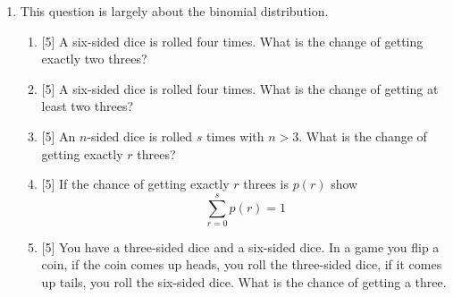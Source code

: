 \documentclass{article}
\newif\ifanswer
\begin{document}
\begin{enumerate}

\item This question is largely about the binomial distribution.
  \begin{enumerate}
  \item{} [5] A six-sided dice is rolled four times. What is the change of getting exactly two threes?
      \item{} [5] A six-sided dice is rolled four times. What is the change of getting at least two threes?
    \item{} [5] An $n$-sided dice is rolled $s$ times with $n>3$. What is the change of getting exactly $r$ threes?
    \item{} [5] If the chance of getting exactly $r$ threes is $p(r)$ show
      $$\sum_{r=0}^sp(r)=1$$
    \item{} [5] You have a three-sided dice and a six-sided dice. In a game
      you flip a coin, if the coin comes up heads, you roll the
      three-sided dice, if it comes up tails, you roll the six-sided
      dice. What is the chance of getting a three.
      \end{enumerate}

\ifanswer
If a six sided dice if rolled four times then the probability of exactly two threes is
\begin{equation}
  p(2)=\left(\begin{array}{c}4\\2\end{array}\right)\left(\frac{1}{6}\right)^2\left(\frac{5}{6}\right)^2
\end{equation}
The chance of at least two threes is the same as the chance of anything except zero threes or one three:
\begin{equation}
  p(\ge 2)=1-\left(\frac{5}{6}\right)^4-4\left(\frac{1}{6}\right)\left(\frac{5}{6}\right)^3
\end{equation}
The more general case is
\begin{equation}
  p(r)=\left(\begin{array}{c}s\\r\end{array}\right)\left(\frac{1}{6}\right)^r\left(\frac{5}{6}\right)^{s-r}
\end{equation}
The sum of $p(r)$ is one follows from the binomial theorem
\begin{equation}
  (p+q)^s=\sum_{r=0}^s\left(\begin{array}{c}s\\r\end{array}\right)p^rq^{s-r}
\end{equation}
but with $q=1-p$. Finally the probability of getting a three in the coin flipping game is
\begin{equation}
  p=\frac{1}{2}\frac{1}{6}+\frac{1}{2}\frac{1}{3}
\end{equation}
\fi


\end{enumerate}
\end{document}
